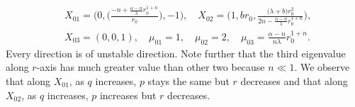 \documentclass[a4paper,11pt]{article}
\begin{document}
\begin{align*}
&X_{01} = \bigg(0, \Big(\frac{-n+ \frac{\alpha-n}{\lambda}r_0^{1+n}}{r_0}\Big), -1\bigg), \quad
X_{02} = \bigg( 1, br_0, \frac{\big({\lambda}+b\big) r_0^2}{2n - \frac{\alpha-n}{\lambda}r_0^{1+n}}\bigg),\\
 &X_{03} = (0,0,1), \quad \mu_{01} = 1, \quad \mu_{02}= 2, \quad \mu_{03} = \frac{\alpha-n}{n\lambda}r_0^{1+n}.
\end{align*}
Every direction is of unstable direction. Note further that the third eigenvalue along $r$-axis has much greater value than other two because $n \ll 1$. We observe that along $X_{01}$, as $q$ increases, $p$ stays the same but $r$ decreases and that along $X_{02}$, as $q$ increases, $p$ increases but $r$ decreases.
\medskip
\end{document}
